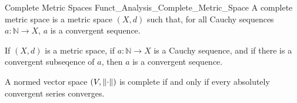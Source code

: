             \begin{ldefinition}{Complete Metric Spaces}
                  {Funct_Analysis_Complete_Metric_Space}
                A complete metric space is a metric space
                $(X,d)$ such that, for all Cauchy sequences
                $a:\mathbb{N}\rightarrow{X}$, $a$ is a convergent
                sequence.
            \end{ldefinition}
            \begin{theorem}
                If $(X,d)$ is a metric space, if
                $a:\mathbb{N}\rightarrow{X}$ is a Cauchy
                sequence, and if there is a convergent subseqence
                of $a$, then $a$ is a convergent sequence.
            \end{theorem}
            \begin{theorem}
                A normed vector space $(V,\lVert\cdot\rVert)$ is
                complete if and only if every absolutely
                convergent series converges.
            \end{theorem}
